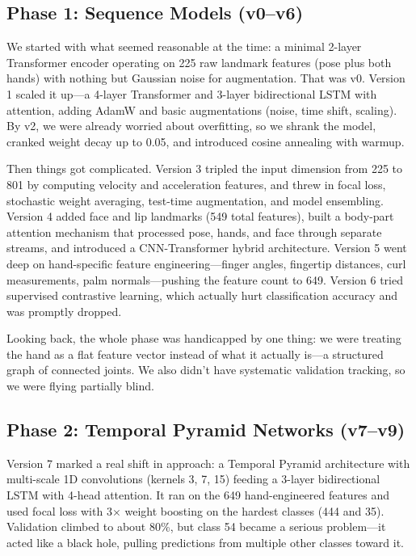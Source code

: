 \documentclass[conference]{IEEEtran}
\begin{document}
\subsection{Phase 1: Sequence Models (v0--v6)}

We started with what seemed reasonable at the time: a minimal 2-layer Transformer encoder operating on 225 raw landmark features (pose plus both hands) with nothing but Gaussian noise for augmentation. That was v0. Version 1 scaled it up---a 4-layer Transformer and 3-layer bidirectional LSTM with attention, adding AdamW and basic augmentations (noise, time shift, scaling). By v2, we were already worried about overfitting, so we shrank the model, cranked weight decay up to 0.05, and introduced cosine annealing with warmup.

Then things got complicated. Version 3 tripled the input dimension from 225 to 801 by computing velocity and acceleration features, and threw in focal loss, stochastic weight averaging, test-time augmentation, and model ensembling. Version 4 added face and lip landmarks (549 total features), built a body-part attention mechanism that processed pose, hands, and face through separate streams, and introduced a CNN-Transformer hybrid architecture. Version 5 went deep on hand-specific feature engineering---finger angles, fingertip distances, curl measurements, palm normals---pushing the feature count to 649. Version 6 tried supervised contrastive learning, which actually hurt classification accuracy and was promptly dropped.

Looking back, the whole phase was handicapped by one thing: we were treating the hand as a flat feature vector instead of what it actually is---a structured graph of connected joints. We also didn't have systematic validation tracking, so we were flying partially blind.

\subsection{Phase 2: Temporal Pyramid Networks (v7--v9)}

Version 7 marked a real shift in approach: a Temporal Pyramid architecture with multi-scale 1D convolutions (kernels 3, 7, 15) feeding a 3-layer bidirectional LSTM with 4-head attention. It ran on the 649 hand-engineered features and used focal loss with 3$\times$ weight boosting on the hardest classes (444 and 35). Validation climbed to about 80\%, but class 54 became a serious problem---it acted like a black hole, pulling predictions from multiple other classes toward it.
\end{document}
